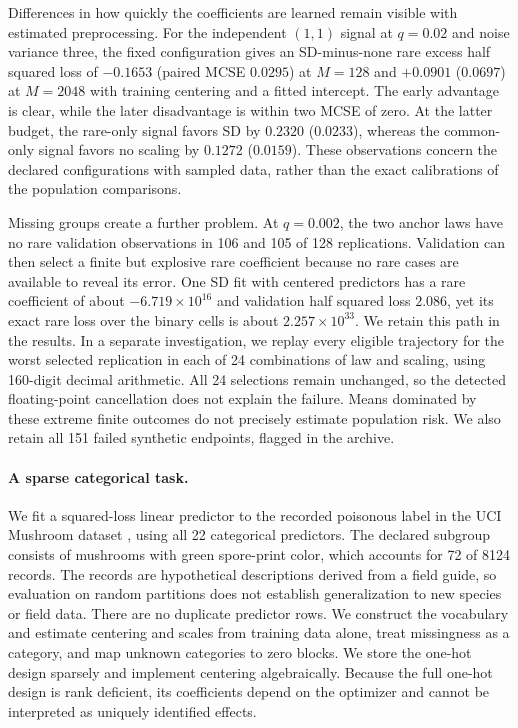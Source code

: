 Differences in how quickly the coefficients are learned remain visible with
estimated preprocessing. For the independent $(1,1)$ signal at $q = 0.02$ and
noise variance three, the fixed configuration gives an SD-minus-none rare excess
half squared loss of $-0.1653$ (paired MCSE $0.0295$) at $M = 128$ and
$+0.0901$ ($0.0697$) at $M = 2048$ with training centering and a fitted
intercept. The early advantage is clear, while the later disadvantage is within
two MCSE of zero. At the latter budget, the rare-only signal favors SD by
$0.2320$ ($0.0233$), whereas the common-only signal favors no scaling by
$0.1272$ ($0.0159$). These observations concern the declared configurations with
sampled data, rather than the exact calibrations of the population comparisons.

Missing groups create a further problem. At $q = 0.002$, the two anchor laws
have no rare validation observations in 106 and 105 of 128 replications.
Validation can then select a finite but explosive rare coefficient because no
rare cases are available to reveal its error. One SD fit with centered
predictors has a rare coefficient of about $-6.719 \times 10^{16}$ and
validation half squared loss $2.086$, yet its exact rare loss over the binary
cells is about $2.257 \times 10^{33}$. We retain this path in the results. In
a separate investigation, we replay every eligible trajectory for the worst
selected replication in each of 24 combinations of law and scaling, using
160-digit decimal arithmetic. All 24 selections remain unchanged, so the
detected floating-point cancellation does not explain the failure. Means
dominated by these extreme finite outcomes do not precisely estimate population
risk. We also retain all 151 failed synthetic endpoints, flagged in the archive.

\paragraph{A sparse categorical task.}

We fit a squared-loss linear predictor to the recorded poisonous label in the
UCI Mushroom dataset \citep{uciMushroom}, using all 22 categorical predictors.
The declared subgroup consists of mushrooms with green spore-print color, which
accounts for 72 of 8124 records. The records are hypothetical descriptions
derived from a field guide, so evaluation on random partitions does not
establish generalization to new species or field data. There are no duplicate
predictor rows. We construct the vocabulary and estimate centering and scales
from training data alone, treat missingness as a category, and map unknown
categories to zero blocks. We store the one-hot design sparsely and implement
centering algebraically. Because the full one-hot design is rank deficient, its
coefficients depend on the optimizer and cannot be interpreted as uniquely
identified effects.

